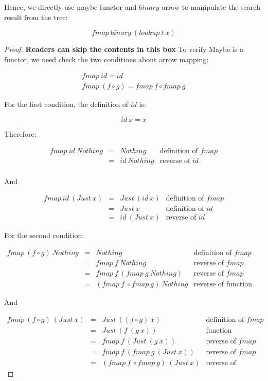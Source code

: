 \documentclass{article}
\begin{document}
\begin{example}
Hence, we directly use maybe functor and $binary$ arrow to manipulate the search result from the tree:

\[
fmap\ binary\ (lookup\ t\ x)
\]

\begin{mdframed}
\begin{proof}
\textbf{Readers can skip the contents in this box} To verify Maybe is a functor, we need check the two conditions about arrow mapping:

\[
\begin{array}{l}
fmap\ id = id \\
fmap\ (f \circ g) = fmap\ f \circ fmap\ g
\end{array}
\]

For the first condition, the definition of $id$ is:

\[
id\ x = x
\]

Therefore:

\[
\begin{array}{rcll}
fmap\ id\ Nothing & = & Nothing & \text{definition of $fmap$} \\
                  & = & id\ Nothing & \text{reverse of $id$} \\
\end{array}
\]

And

\[
\begin{array}{rcll}
fmap\ id\ (Just\ x) & = & Just\ (id\ x) & \text{definition of $fmap$} \\
                    & = & Just\ x & \text{definition of $id$} \\
                    & = & id\ (Just\ x) & \text{reverse of $id$}
\end{array}
\]

For the second condition:

\[
\begin{array}{rcll}
fmap\ (f \circ g)\ Nothing & = & Nothing & \text{definition of $fmap$} \\
           & = & fmap\ f\ Nothing & \text{reverse of $fmap$} \\
           & = & fmap\ f\ (fmap\ g\ Nothing) & \text{reverse of $fmap$} \\
           & = & (fmap\ f\ \circ fmap\ g)\ Nothing & \text{reverse of function composition}
\end{array}
\]

And

\[
\begin{array}{rcll}
fmap\ (f \circ g)\ (Just\ x) & = & Just\ ((f \circ g)\ x) & \text{definition of $fmap$} \\
           & = & Just\ (f\ (g\ x)) & \text{function composition} \\
           & = & fmap\ f\ (Just\ (g\ x)) & \text{reverse of $fmap$} \\
           & = & fmap\ f\ (fmap\ g\ (Just\ x)) & \text{reverse of $fmap$} \\
           & = & (fmap\ f\ \circ fmap\ g)\ (Just\ x) & \text{reverse of function composition}
\end{array}
\]


\end{proof}
\end{mdframed}
\end{example}
\end{document}
